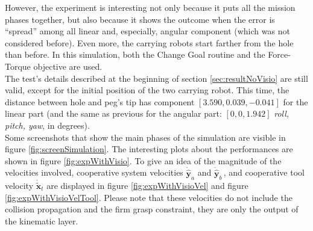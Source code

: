 However, the experiment is interesting not only because it puts all the mission phases together, but also because it shows the outcome when the error is \enquote{spread} among all linear and, especially, angular component (which was not considered before). Even more, the carrying robots start farther from the hole than before. In this simulation, both the Change Goal routine and the Force-Torque objective are used.\\
The test's details described at the beginning of section \ref{sec:resultNoVisio} are still valid, except for the initial position of the two carrying robot. This time, the distance between hole and peg's tip has component $[3.590, 0.039, -0.041]$ for the linear part (and the same as previous for the angular part: $[0, 0, 1.942]$ \textit{roll, pitch, yaw}, in degrees).\\
Some screenshots that show the main phases of the simulation are visible in figure \ref{fig:screenSimulation}. The interesting plots about the performances are shown in figure \ref{fig:expWithVisio}. To give an idea of the magnitude of the velocities involved, cooperative system velocities $\dot{\hat{\boldsymbol{y}}}_a$ and $\dot{\hat{\boldsymbol{y}}}_b\,$, and cooperative tool velocity $\dot{\tilde{\boldsymbol{x}}}_t$ are displayed in figure \ref{fig:expWithVisioVel} and figure \ref{fig:expWithVisioVelTool}. Please note that these velocities do not include the collision propagation and the firm grasp constraint, they are only the output of the kinematic layer.


